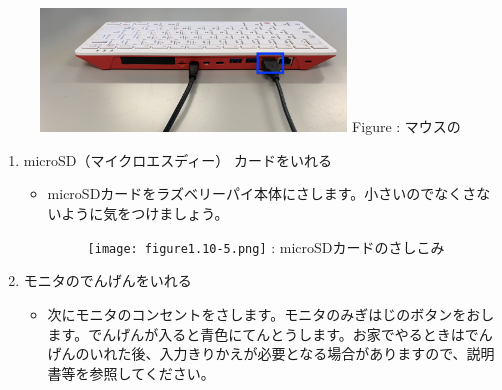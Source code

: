 \documentclass[a4paper,12pt]{jarticle}
\begin{document}
\begin{enumerate}
\begin{figure}[h]
  \begin{minipage}{8.135cm}
    {\upshape
      \includegraphics[width=8.135cm]{figure1.10-4.png}
      \newline
      Figure :
      マウスの}
  \end{minipage}
\end{figure}
\setcounter{saveenum}{\value{enumi}}
\begin{enumerate}
  \setcounter{enumi}{\value{saveenum}}
  \clearpage
  \item
        microSD（マイクロエスディー）
        カードをいれる

        \begin{itemize}
          \item
                microSDカードをラズベリーパイ本体にさします。小さいのでなくさないように気をつけましょう。

                \begin{figure}[h]
                  \centering
                  \begin{minipage}{6.334cm}
                    {\upshape
                      \texttt{[image: figure1.10-5.png]}
                      \newline
                      : microSDカードのさしこみ}
                  \end{minipage}
                \end{figure}

                \bigskip
        \end{itemize}
  \item モニタのでんげんをいれる

        \begin{itemize}
          \item
                次にモニタのコンセントをさします。モニタのみぎはじのボタンをおします。でんげんが入ると青色にてんとうします。お家でやるときはでんげんのいれた後、入力きりかえが必要となる場合がありますので、説明書等を参照してください。



\end{itemize}
\end{enumerate}
\end{enumerate}
\end{document}
